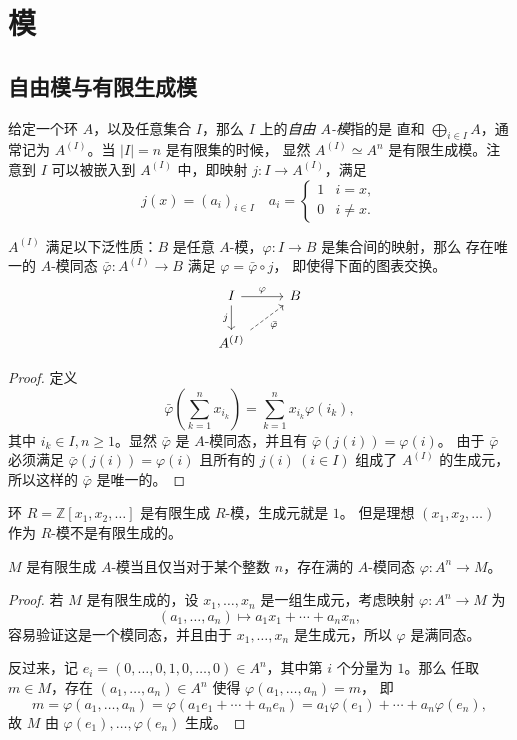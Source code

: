 \chapter{模}

\section{自由模与有限生成模}

给定一个环 $A$，以及任意集合 $I$，那么 $I$ 上的\emph{自由 $A$-模}指的是
直和 $\bigoplus_{i\in I}A$，通常记为 $A^{(I)}$。当 $|I|=n$ 是有限集的时候，
显然 $A^{(I)}\simeq A^n$ 是有限生成模。注意到 $I$ 可以被嵌入到
$A^{(I)}$ 中，即映射 $j:I\to A^{(I)}$，满足
\[
  j(x)=(a_i)_{i\in I}\quad
  a_i=
  \begin{cases}
    1 & i=x,\\
    0 & i\neq x.
  \end{cases}
\]


\begin{theorem}[自由模的泛性质]
  $A^{(I)}$ 满足以下泛性质：$B$ 是任意 $A$-模，$\varphi:I\to B$ 是集合间的映射，那么
  存在唯一的 $A$-模同态 $\bar{\varphi}:A^{(I)}\to B$ 满足 $\varphi=\bar\varphi\circ j$，
  即使得下面的图表交换。
  \[
    \begin{tikzcd}
      I \arrow[d,"j"']\arrow[r,"\varphi"] & B \\
      A^{(I)}\arrow[ur,dashed,"\bar{\varphi}"'] & 
    \end{tikzcd}
  \]
\end{theorem}
\begin{proof}
  定义
  \[
    \bar{\varphi}\left(\sum_{k=1}^n x_{i_k}\right)=\sum_{k=1}^nx_{i_k}\varphi(i_k),
  \] 
  其中 $i_k\in I,n\geq 1$。显然 $\bar\varphi$ 是 $A$-模同态，并且有 $\bar\varphi(j(i))=\varphi(i)$。
  由于 $\bar\varphi$ 必须满足 $\bar\varphi(j(i))=\varphi(i)$ 且所有的 $j(i)\ (i\in I)$ 组成了
  $A^{(I)}$ 的生成元，所以这样的 $\bar\varphi$ 是唯一的。
\end{proof}

\begin{example}
    环 $R=\mathbb{Z}[x_1,x_2,\dots]$ 是有限生成 $R$-模，生成元就是 $1$。
    但是理想 $(x_1,x_2,\dots)$ 作为 $R$-模不是有限生成的。
\end{example}

\begin{theorem}
  $M$ 是有限生成 $A$-模当且仅当对于某个整数 $n$，存在满的 $A$-模同态 
  $\varphi:A^n\to M$。
\end{theorem}
\begin{proof}
  若 $M$ 是有限生成的，设 $x_1,\dots,x_n$ 是一组生成元，考虑映射 $\varphi:A^n\to M$ 为
  \[
    (a_1,\dots,a_n)\mapsto a_1x_1+\cdots+a_nx_n,
  \]
  容易验证这是一个模同态，并且由于 $x_1,\dots,x_n$ 是生成元，所以 $\varphi$ 是满同态。

  反过来，记 $e_i=(0,\dots,0,1,0,\dots,0)\in A^n$，其中第 $i$ 个分量为 $1$。那么
  任取 $m\in M$，存在 $(a_1,\dots,a_n)\in A^n$ 使得 $\varphi(a_1,\dots,a_n)=m$，
  即
  \[
    m=\varphi(a_1,\dots,a_n)=\varphi(a_1e_1+\cdots+a_ne_n)
    =a_1\varphi(e_1)+\cdots+a_n\varphi(e_n),  
  \]
  故 $M$ 由 $\varphi(e_1),\dots,\varphi(e_n)$ 生成。
\end{proof}

